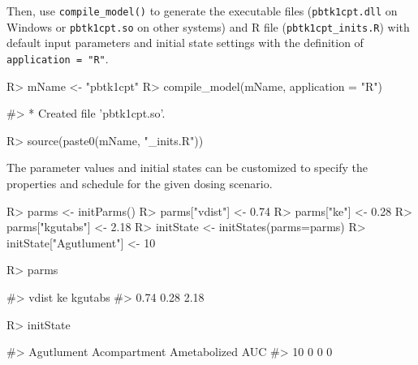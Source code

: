 \documentclass[article]{jss}
\begin{document}
Then, use \texttt{compile\_model()} to generate the executable files
(\texttt{pbtk1cpt.dll} on Windows or \texttt{pbtk1cpt.so} on other
systems) and R file (\texttt{pbtk1cpt\_inits.R}) with default input
parameters and initial state settings with the definition of
\texttt{application\ =\ "R"}.

\begin{CodeChunk}

\begin{CodeInput}
R> mName <- "pbtk1cpt"
R> compile_model(mName, application = "R")
\end{CodeInput}

\begin{CodeOutput}
#> * Created file 'pbtk1cpt.so'.
\end{CodeOutput}

\begin{CodeInput}
R> source(paste0(mName, "_inits.R"))
\end{CodeInput}
\end{CodeChunk}

The parameter values and initial states can be customized to specify the
properties and schedule for the given dosing scenario.

\begin{CodeChunk}

\begin{CodeInput}
R> parms <- initParms()
R> parms["vdist"] <- 0.74
R> parms["ke"] <- 0.28
R> parms["kgutabs"] <- 2.18
R> initState <- initStates(parms=parms)
R> initState["Agutlument"] <- 10
\end{CodeInput}
\end{CodeChunk}

\begin{CodeChunk}

\begin{CodeInput}
R> parms
\end{CodeInput}

\begin{CodeOutput}
#>   vdist      ke kgutabs 
#>    0.74    0.28    2.18
\end{CodeOutput}
\end{CodeChunk}

\begin{CodeChunk}

\begin{CodeInput}
R> initState
\end{CodeInput}

\begin{CodeOutput}
#>   Agutlument Acompartment Ametabolized          AUC 
#>           10            0            0            0
\end{CodeOutput}
\end{CodeChunk}
\end{document}
